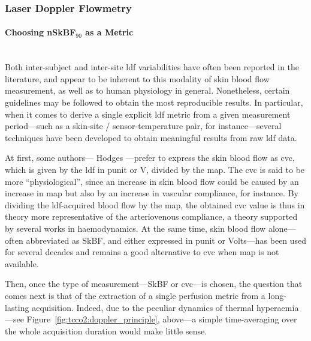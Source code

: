 \subsubsection{\texorpdfstring{Laser Doppler Flowmetry}{LDF}}

\paragraph{Choosing \texorpdfstring{nSkBF$_{90}$}{nSkBF90} as a Metric}\mbox{}\\

Both inter-subject and inter-site \gls{ldf} variabilities have often been reported in the literature\cite{johnson1984, cracowski2006, roustit2012, minson2010, hodges2016, cracowski2016}, and appear to be inherent to this modality of skin blood flow measurement, as well as to human physiology in general. Nonetheless, certain guidelines may be followed to obtain the most reproducible results\cite{cracowski2006}. In particular, when it comes to derive a single explicit \gls{ldf} metric from a given measurement period---such as a skin-site / sensor-temperature pair, for instance---several techniques have been developed to obtain meaningful results from raw \gls{ldf} data.

At first, some authors---\eg{} Hodges \etal{}\cite{hodges2016}---prefer to express the skin blood flow as \gls{cvc}, which is given by the \gls{ldf} in \gls{punit} or V, divided by the \gls{map}. The \gls{cvc} is said to be more \enquote{physiological}\cite{cracowski2006}, since an increase in skin blood flow could be caused by an increase in \gls{map} but also by an increase in vascular compliance, for instance. By dividing the \gls{ldf}-acquired blood flow by the \gls{map}, the obtained \gls{cvc} value is thus in theory more representative of the arteriovenous compliance, a theory supported by several works in haemodynamics\cite{johnsonpc1986, lautt1989, herring2018levick}. At the same time, skin blood flow alone---often abbreviated as SkBF, and either expressed in \gls{punit} or Volts---has been used for several decades\cite{johnson1984, frantz2012} and remains a good alternative to \gls{cvc} when \gls{map} is not available.

Then, once the type of measurement---SkBF or \gls{cvc}---is chosen, the question that comes next is that of the extraction of a single perfusion metric from a long-lasting acquisition. Indeed, due to the peculiar dynamics of thermal hyperaemia---see Figure~\ref{fig:tcco2:doppler_principle}, above---a simple time-averaging over the whole acquisition duration would make little sense.

